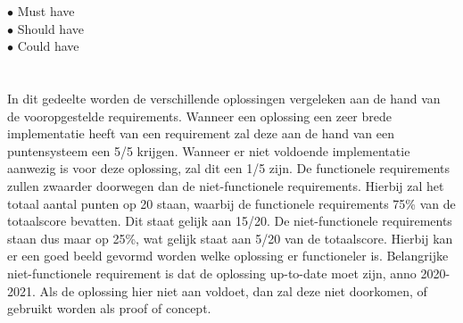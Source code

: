\begin{description}
    \item[$\bullet$ Must have] 
    \item[$\bullet$ Should have]
    \item[$\bullet$ Could have]
\end{description}

\section{}
\label{sec:Hoe beantwoorden de verschillende oplossingen aan de bovenstaande requirements}

In dit gedeelte worden de verschillende oplossingen vergeleken aan de hand van de vooropgestelde requirements. Wanneer een oplossing een zeer brede implementatie heeft van een requirement zal deze aan de hand van een puntensysteem een 5/5 krijgen. Wanneer er niet voldoende implementatie aanwezig is voor deze oplossing, zal dit een 1/5 zijn. De functionele requirements zullen zwaarder doorwegen dan de niet-functionele requirements. Hierbij zal het totaal aantal punten op 20 staan, waarbij de functionele requirements 75\% van de totaalscore bevatten. Dit staat gelijk aan 15/20. De niet-functionele requirements staan dus maar op 25\%, wat gelijk staat aan 5/20 van de totaalscore. Hierbij kan er een goed beeld gevormd worden welke oplossing er functioneler is. Belangrijke niet-functionele requirement is dat de oplossing up-to-date moet zijn, anno 2020-2021. Als de oplossing hier niet aan voldoet, dan zal deze niet doorkomen, of gebruikt worden als proof of concept.

